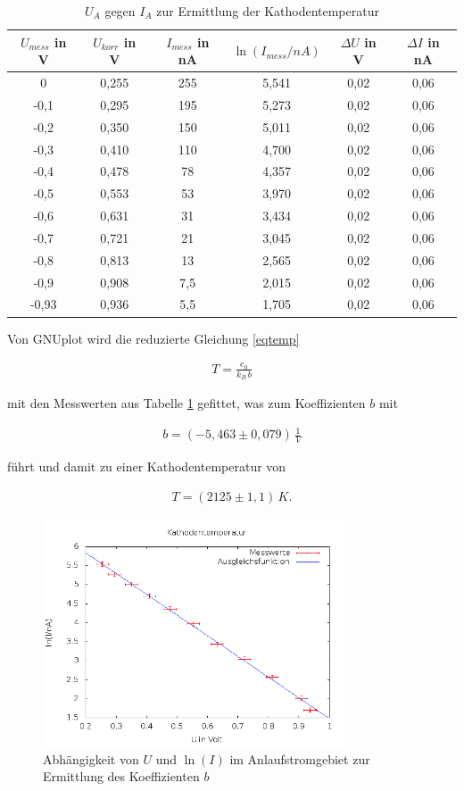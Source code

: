 \begin{table}[H]
\begin{tabular}{|c|c|c|c|c|c|}
$U_{mess}$ in V & $U_{korr}$ in V & $I_{mess}$ in nA & $\ln(I_{mess}/nA)$ & $\Delta U$ in V & $\Delta I$ in nA \\
\hline
0&	0,255&	255&	5,541&	0,02&	0,06 \\
-0,1&	0,295&	195&	5,273&	0,02&	0,06\\
-0,2&	0,350&	150&	5,011&	0,02&	0,06\\
-0,3&	0,410&	110&	4,700&	0,02&	0,06\\
-0,4&	0,478&	78&	4,357&	0,02&	0,06\\
-0,5&	0,553&	53&	3,970&	0,02&	0,06\\
-0,6&	0,631&	31&	3,434&	0,02&	0,06\\
-0,7&	0,721&	21&	3,045&	0,02&	0,06\\
-0,8&	0,813&	13&	2,565&	0,02&	0,06\\
-0,9&	0,908&	7,5&	2,015&	0,02&	0,06\\
-0,93&	0,936&	5,5&	1,705&	0,02&	0,06\\
\hline
\end{tabular}
\caption{$U_A$ gegen $I_A$ zur Ermittlung der Kathodentemperatur}
\label{tabtemp}
\end{table}

Von GNUplot wird die reduzierte Gleichung \eqref{eqtemp}

\begin{align}
 T = \frac{e_0}{k_B \, b}
\end{align}

mit den Messwerten aus Tabelle \ref{tabtemp} gefittet, was zum Koeffizienten $b$ mit

\begin{align}
 b = (-5,463 \pm 0,079) \, \frac{1}{V}
\end{align}

führt und damit zu einer Kathodentemperatur von

\begin{align}
 T = (2125 \pm 1,1)\, K.
\end{align}

\begin{figure}[H]
\includegraphics[width=0.8\textwidth]{pics/504c.png}
\caption{Abhängigkeit von $U$ und $\ln(I)$ im Anlaufstromgebiet zur Ermittlung des Koeffizienten $b$}
\end{figure}

